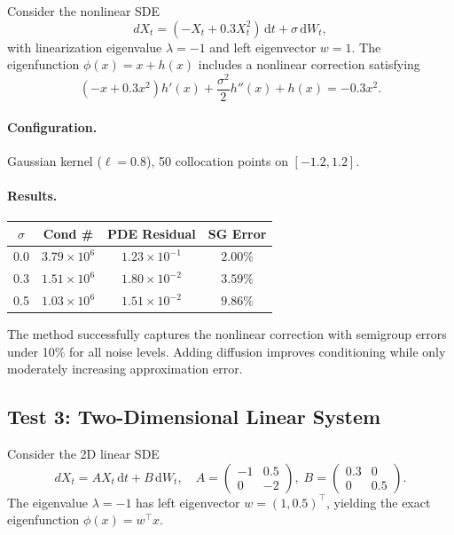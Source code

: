\documentclass[11pt,a4paper]{article}
\newcommand{\dt}{\,\mathrm{d}t}
\newcommand{\dW}{\,\mathrm{d}W}
\begin{document}
Consider the nonlinear SDE
\begin{equation}
    dX_t = (-X_t + 0.3 X_t^2)\dt + \sigma\dW_t,
\end{equation}
with linearization eigenvalue $\lambda=-1$ and left eigenvector $w=1$. The eigenfunction $\phi(x) = x + h(x)$ includes a nonlinear correction satisfying
\begin{equation}
    (-x + 0.3x^2)h'(x) + \frac{\sigma^2}{2}h''(x) + h(x) = -0.3x^2.
\end{equation}

\paragraph{Configuration.} Gaussian kernel ($\ell=0.8$), 50 collocation points on $[-1.2, 1.2]$.

\paragraph{Results.}
\begin{center}
\begin{tabular}{cccc}
\toprule
$\sigma$ & Cond \# & PDE Residual & SG Error   \\
\midrule
0.0 & $3.79\times 10^6$ & $1.23\times 10^{-1}$ & $2.00\%$   \\
0.3 & $1.51\times 10^6$ & $1.80\times 10^{-2}$ & $3.59\%$   \\
0.5 & $1.03\times 10^6$ & $1.51\times 10^{-2}$ & $9.86\%$   \\
\bottomrule
\end{tabular}
\end{center}

The method successfully captures the nonlinear correction with semigroup errors under 10\% for all noise levels. Adding diffusion improves conditioning while only moderately increasing approximation error.

\subsection{Test 3: Two-Dimensional Linear System}

Consider the 2D linear SDE
\begin{equation}
    dX_t = AX_t\dt + B\dW_t, \quad
    A = \begin{pmatrix} -1 & 0.5 \\ 0 & -2 \end{pmatrix}, \;
    B = \begin{pmatrix} 0.3 & 0 \\ 0 & 0.5 \end{pmatrix}.
\end{equation}
The eigenvalue $\lambda=-1$ has left eigenvector $w = (1, 0.5)^\top$, yielding the exact eigenfunction $\phi(x) = w^\top x$.
\end{document}
